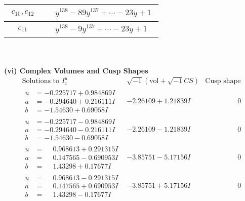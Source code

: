 \documentclass[1p]{elsarticle_modified}
\theoremstyle{definition}
\newcommand{\I}{\sqrt{-1}}
\begin{document}
\begin{tabular}{m{50pt}|m{274pt}}
\hline $$\begin{aligned}c_{10},c_{12}\end{aligned}$$&$\begin{aligned}
&y^{138}-89 y^{137}+\cdots-23 y+1
\end{aligned}$\\
\hline $$\begin{aligned}c_{11}\end{aligned}$$&$\begin{aligned}
&y^{138}-9 y^{137}+\cdots-23 y+1
\end{aligned}$\\
\hline
\end{tabular}\\~\\
\newpage\flushleft \textbf{(vi) Complex Volumes and Cusp Shapes}
$$\begin{array}{c|c|c}  
\text{Solutions to }I^u_{1}& \I (\text{vol} + \sqrt{-1}CS) & \text{Cusp shape}\\
 \hline 
\begin{aligned}
u &= -0.225717 + 0.984869 I \\
a &= -0.294640 + 0.216111 I \\
b &= -1.54630 + 0.69058 I\end{aligned}
 & -2.26109 + 1.21839 I & \phantom{-0.000000 } 0 \\ \hline\begin{aligned}
u &= -0.225717 - 0.984869 I \\
a &= -0.294640 - 0.216111 I \\
b &= -1.54630 - 0.69058 I\end{aligned}
 & -2.26109 - 1.21839 I & \phantom{-0.000000 } 0 \\ \hline\begin{aligned}
u &= \phantom{-}0.968613 + 0.291315 I \\
a &= \phantom{-}0.147565 - 0.690953 I \\
b &= \phantom{-}1.43298 + 0.17677 I\end{aligned}
 & -3.85751 - 5.17156 I & \phantom{-0.000000 } 0 \\ \hline\begin{aligned}
u &= \phantom{-}0.968613 - 0.291315 I \\
a &= \phantom{-}0.147565 + 0.690953 I \\
b &= \phantom{-}1.43298 - 0.17677 I\end{aligned}
 & -3.85751 + 5.17156 I & \phantom{-0.000000 } 0 \\ \hline\begin{aligned}

\end{aligned}
\end{array}$$
\end{document}
